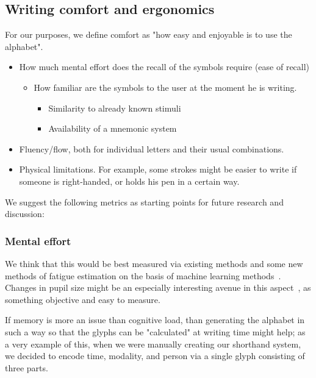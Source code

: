 \documentclass[conference]{IEEEtran}
\begin{document}
\subsection{Writing comfort and ergonomics}
For our purposes, we define comfort as "how easy and enjoyable is to use the alphabet". 
\begin{itemize}
        \item How much mental effort does the recall of the symbols require (ease of recall)
                \begin{itemize}
                        \item How familiar are the symbols to the user at the moment he is writing. 
                                \begin{itemize}
                                        \item Similarity to already known stimuli
                                        \item Availability of a mnemonic system
                                \end{itemize}
                \end{itemize}
        \item Fluency/flow, both for individual letters and their usual combinations.
        \item Physical limitations. For example, some strokes might be easier to write if someone is right-handed, or holds his pen in a certain way.
\end{itemize}

We suggest the following metrics as starting points for future research and discussion:

\subsubsection{Mental effort}
We think that this would be best measured via existing methods and some new methods of fatigue estimation on the basis of machine learning methods~\cite{gordienko2017ccp}. Changes in pupil size might be an especially interesting avenue in this aspect~\cite{Alns2014PupilSS}, as something objective and easy to measure.

If memory is more an issue than cognitive load, than generating the alphabet in such a way so that the glyphs can be "calculated" at writing time might help; as a very example of this, when we were manually creating our shorthand system, we decided to encode 
 time, modality, and person via a single glyph consisting of three parts. 
\end{document}
